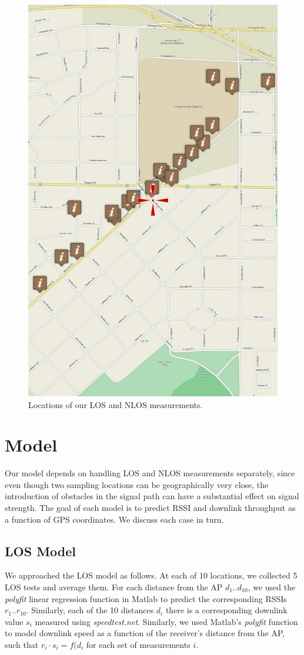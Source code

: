 \documentclass[12pt]{article}
\begin{document}
\begin{figure}[t]
\center
\includegraphics[width=.5\linewidth]{locations}
\caption{Locations of our LOS and NLOS measurements.}
\label{fig:locations}
\end{figure}

\section{Model} 
Our model depends on handling LOS and NLOS measurements separately, since even
though two sampling locations can be geographically very close, the introduction
of obstacles in the signal path can have a substantial effect on signal
strength. The goal of each model is to predict RSSI and downlink throughput as a
function of GPS coordinates. We discuss each case in turn.

\subsection{LOS Model} We approached the LOS model as follows. At each of 10
locations, we collected 5 LOS tests and average them. For each distance from the
AP $d_{1}..d_{10}$, we used the \textit{polyfit} linear regression function in
Matlab to predict the corresponding RSSIs $r_{1}..r_{10}$.
Similarly, each of the 10 distances $d_{i}$ there is a corresponding downlink
value $s_{i}$ measured using \textit{speedtest.net}.  Similarly, we used
Matlab's \textit{polyfit} function to model downlink speed as a function of
the receiver's distance from the AP, such that $r_{i} \cdot s_{i} = f(d_{i}$ for
each set of measurements $i$. 
\end{document}
